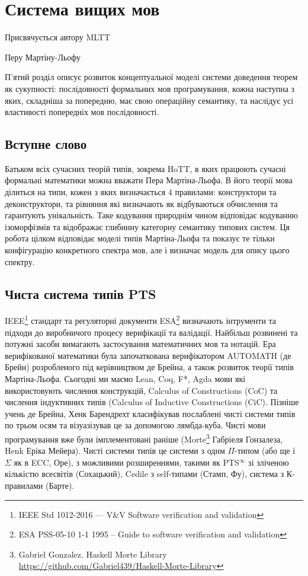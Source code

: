 
\chapter{Система вищих мов}
\epigraph{Присвячується автору MLTT}{Перу Мартіну-Льофу}

П'ятий розділ описує розвиток концептуальної моделі системи доведення теорем як сукупності:
послідовності формальних мов програмування, кожна наступна з яких, складніша за попередню,
має свою операційну семантику, та наслідує усі властивості попередніх мов послідовності.

\section*{Вступне слово}
Батьком всіх сучасних теорій типів, зокрема HoTT, в яких працюють сучасні формальні
математики можна вважати Пера Мартіна-Льофа. В його теорії мова ділиться на типи,
кожен з яких визначається 4 правилами: конструктори та деконструктори,
та рівняння які визначають як відбуваються обчислення та гарантують унікальність.
Таке кодування природнім чином відповідає кодуванню ізоморфізмів та відображає
глибинну категорну семантику типових систем. Ця робота цілком відповідає
моделі типів Мартіна-Льофа та показує те тільки конфігурацію конкретного спектра мов,
але і визначає модель для опису цього спектру.

\section{Чиста система типів PTS}
IEEE\footnote{IEEE Std 1012-2016  --- V\&V Software verification and validation} стандарт
та регуляторні документи ESA\footnote{ESA PSS-05-10 1-1 1995 -- Guide to software verification and validation}
визначають інтрументи та підходи до виробничого процесу верифікації та валідації.
Найбільш розвинені та потужні засоби вимагають застосування математичних мов та нотацій.
Ера верифікованої математики була започаткована верифікатором AUTOMATH\cite{deBruijn83} (де Брейн) розробленого
під керівництвом де Брейна, а також розвиток теорії типів Мартіна-Льофа\cite{Lof84}.
Сьогодні ми маємо Lean, Coq, F*, Agda мови які використовують числення
конструкцій, Calculus of Constructions\cite{Coq88} (CoC)
та числення індуктивних типів (Calculus of Inductive Constructions\cite{Pfenning89} (CiC).
Пізніше учень де Брейна, Хенк Барендрехт класифікував послаблені чисті
системи типів по трьом осям та візуазізував це за допомогою лямбда-куба\cite{Henk93}.
Чисті мови програмування вже були імплементовані раніше
(Morte\footnote{Gabriel Gonzalez. Haskell Morte Library \url{https://github.com/Gabriel439/Haskell-Morte-Library}} Габріеля Гонзалеза, Henk\cite{Erik97} Еріка Мейера).
Чисті системи типів це системи з однм $\Pi$-типом (або ще і $\Sigma$ як в ECC\cite{Ore92}, Оре),
з можливими розширеннями, такими як PTS$^\infty$ зі зліченою кількістю всесвітів\cite{Tonpa18} (Сохацький),
Cedile з self-типами\cite{Fu14}\cite{Stump17} (Стамп, Фу), система з К-правилами\cite{Barthe95} (Барте).

